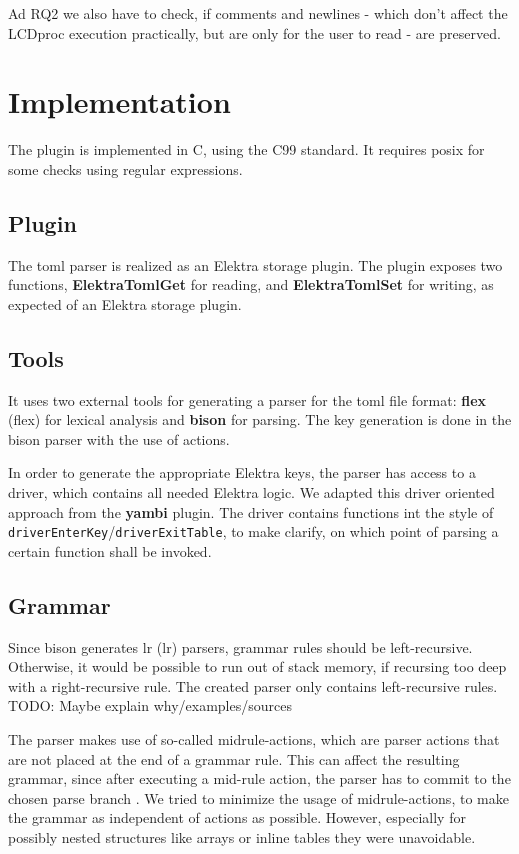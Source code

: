 \documentclass[draft,final]{vutinfth} %
\begin{document}
Ad RQ2 we also have to check, if comments and newlines - which don't affect the LCDproc execution practically, but are only for the user to read - are preserved.

\chapter{Implementation}

The plugin is implemented in C, using the C99 standard. It requires \acrshort{posix} for some checks using regular expressions.

\section{Plugin}
The \acrshort{toml} parser is realized as an Elektra storage plugin. The plugin exposes two functions, \textbf{ElektraTomlGet} for reading, and \textbf{ElektraTomlSet} for writing, as expected of an Elektra storage plugin.

\section{Tools}
It uses two external tools for generating a parser for the toml file format: \textbf{\acrshort{flex}} (\acrlong{flex}) \cite{flexgit} for lexical analysis and \textbf{bison} \cite{bisonmain} for parsing.
The key generation is done in the bison parser with the use of actions.

In order to generate the appropriate Elektra keys, the parser has access to a driver, which contains all needed Elektra logic.
We adapted this driver oriented approach from the \textbf{yambi}\cite{Elektrayambi} plugin.
The driver contains functions int the style of \texttt{driverEnterKey}/\texttt{driverExitTable}, to make clarify, on which point of parsing a certain function shall be invoked.

\section{Grammar}
Since bison generates \acrshort{lr} (\acrlong{lr}) parsers, grammar rules should be left-recursive.
Otherwise, it would be possible to run out of stack memory, if recursing too deep with a right-recursive rule.
The created parser only contains left-recursive rules.
TODO: Maybe explain why/examples/sources

The parser makes use of so-called midrule-actions, which are parser actions that are not placed at the end of a grammar rule.
This can affect the resulting grammar, since after executing a mid-rule action, the parser has to commit to the chosen parse branch \cite{bisonmidruleconflicts}.
We tried to minimize the usage of midrule-actions, to make the grammar as independent of actions as possible.
However, especially for possibly nested structures like arrays or inline tables they were unavoidable.
\end{document}
